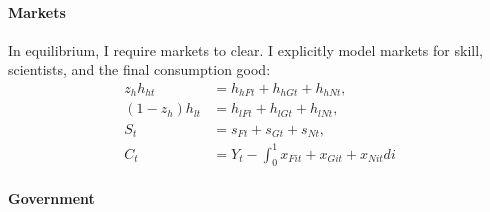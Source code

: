 \paragraph{Markets}
In equilibrium, I require markets to clear. I explicitly model markets for skill, scientists, and the final consumption good:
\begin{align}
z_h h_{ht}&=h_{hFt}+h_{hGt}+h_{hNt},\\
(1-z_h) h_{lt}&=h_{lFt}+h_{lGt}+h_{lNt},\\
S_t&=s_{Ft}+s_{Gt}+s_{Nt},\\
C_t&=Y_t-\int_{0}^{1}x_{Fit}+x_{Git}+x_{Nit}di  %
\end{align}

\paragraph{Government}

